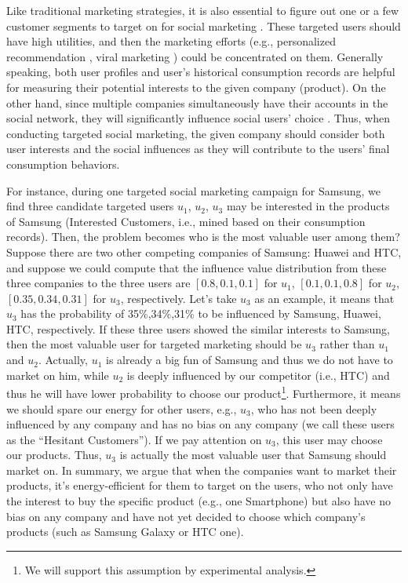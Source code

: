 \documentclass{llncs}
\begin{document}
Like traditional marketing strategies, it is also essential to figure out one or a few customer segments to target on for social marketing \cite{liu2013conducting}. These targeted users should have high utilities, and then the marketing efforts (e.g., personalized recommendation \cite{kantor2011recommender}, viral marketing \cite{kempe2003maximizing}) could be concentrated on them. Generally speaking, both user profiles \cite{alowibdi2013empirical} and user's historical consumption records \cite{jamali2009trustwalker} are helpful for measuring their potential interests to the given company (product). On the other hand, since multiple companies simultaneously have their accounts in the social network, they will significantly
influence social users' choice \cite{he2012influence,chen2013information}. Thus, when conducting targeted social marketing, the given company should consider both user interests and the social influences as they will contribute to the users' final consumption behaviors.

For instance, during one targeted social marketing campaign for Samsung, we find three candidate targeted users $u_1$, $u_2$, $u_3$ may be interested in the products of Samsung (Interested Customers, i.e., mined based on their consumption records). Then, the problem becomes who is the most valuable user among them? Suppose there are two other competing companies of Samsung: Huawei and HTC, and suppose we could compute that the influence value distribution from these three companies to the three users are $[0.8,0.1,0.1]$ for $u_1$, $[0.1,0.1,0.8]$ for $u_2$, $[0.35,0.34,0.31]$ for $u_3$, respectively. Let's take $u_3$ as an example, it means that $u_3$ has the probability of 35\%,34\%,31\% to be influenced by Samsung, Huawei, HTC, respectively. 
If these three users showed the similar interests to Samsung, then the most valuable user for targeted marketing should be $u_3$ rather than $u_1$ and $u_2$. Actually, $u_1$ is already a big fun of Samsung and thus we do not have to market on him, while $u_2$ is deeply influenced by our competitor (i.e., HTC) and thus he will have lower probability to choose our product\footnote{We will support this assumption by experimental analysis.}. Furthermore, it means we should spare our energy for other users, e.g., $u_3$, who has not been deeply influenced by any company and has no bias on any company (we call these users as the ``Hesitant Customers''). If we pay attention on $u_3$, this user may choose our products. Thus, $u_3$ is actually the most valuable user that Samsung should market on. In summary, we argue that when the companies want to market their products, it's energy-efficient for them to target on the users, who not only have the interest to buy the specific product (e.g., one Smartphone) but also have no bias on any company and have not yet decided to choose which company's products (such as Samsung Galaxy or HTC one).
\end{document}

